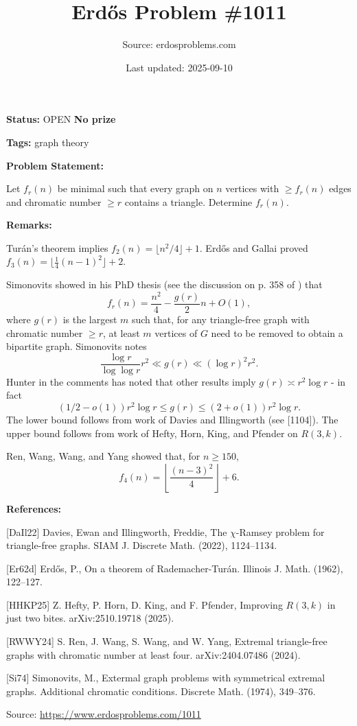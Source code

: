 \documentclass{article}
\title{Erd\H{o}s Problem \#1011}
\date{Last updated: 2025-09-10}
\author{Source: erdosproblems.com}
\begin{document}
\maketitle

\noindent\textbf{Status:} OPEN \quad \textbf{No prize}

\noindent\textbf{Tags:} graph theory

\medskip
\noindent\textbf{Problem Statement:}

Let $f_r(n)$ be minimal such that every graph on $n$ vertices with $\geq f_r(n)$ edges and chromatic number $\geq r$ contains a triangle. Determine $f_r(n)$.

\bigskip
\noindent\textbf{Remarks:}

Tur\'{a}n's theorem implies $f_2(n)=\lfloor n^2/4\rfloor+1$. Erd\H{o}s and Gallai \cite{Er62d} proved $f_3(n)=\lfloor \frac{1}{4}(n-1)^2\rfloor+2$.

Simonovits showed in his PhD thesis (see the discussion on p. 358 of \cite{Si74}) that\[f_r(n)=\frac{n^2}{4}-\frac{g(r)}{2}{n}+O(1),\]where $g(r)$ is the largest $m$ such that, for any triangle-free graph with chromatic number $\geq r$, at least $m$ vertices of $G$ need to be removed to obtain a bipartite graph. Simonovits \cite{Si74} notes\[\frac{\log r}{\log\log r}r^2 \ll g(r) \ll (\log r)^2r^2.\]Hunter in the comments has noted that other results imply $g(r)\asymp r^2\log r$ - in fact\[(1/2-o(1))r^2\log r\leq g(r)\leq (2+o(1))r^2\log r.\]The lower bound follows from work of Davies and Illingworth \cite{DaIl22} (see [1104]). The upper bound follows from work of Hefty, Horn, King, and Pfender \cite{HHKP25} on $R(3,k)$.

Ren, Wang, Wang, and Yang \cite{RWWY24} showed that, for $n\geq 150$,\[f_4(n)=\left\lfloor\frac{(n-3)^2}{4}\right\rfloor+6.\]

\bigskip
\noindent\textbf{References:}

[DaIl22] Davies, Ewan and Illingworth, Freddie, The {$\chi$}-{R}amsey problem for triangle-free graphs. SIAM J. Discrete Math. (2022), 1124--1134.
 
 [Er62d] Erd\H{o}s, P., On a theorem of {R}ademacher-Tur\'{a}n. Illinois J. Math. (1962), 122--127.
 
 [HHKP25] Z. Hefty, P. Horn, D. King, and F. Pfender, Improving $R(3,k)$ in just two bites. arXiv:2510.19718 (2025).
 
 [RWWY24] S. Ren, J. Wang, S. Wang, and W. Yang, Extremal triangle-free graphs with chromatic number at least four. arXiv:2404.07486 (2024).
 
 [Si74] Simonovits, M., Extermal graph problems with symmetrical extremal graphs.
{A}dditional chromatic conditions. Discrete Math. (1974), 349--376.

\bigskip
\noindent\small{Source: \url{https://www.erdosproblems.com/1011}}
\end{document}
